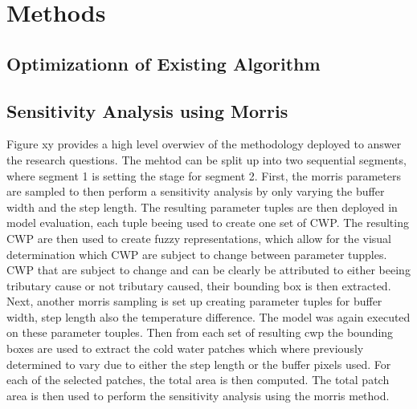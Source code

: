\section{Methods}


\subsection{Optimizationn of Existing Algorithm}

% 



\subsection{Sensitivity Analysis using Morris}

Figure xy provides a high level overwiev of the methodology deployed to answer the research questions. The mehtod can be split up into two sequential segments, where segment 1 is setting the stage for segment 2. First, the morris parameters are sampled to then perform a sensitivity analysis by only varying the buffer width and the step length. The resulting parameter tuples are then deployed in model evaluation, each tuple beeing used to create one set of CWP. The resulting CWP are then used to create fuzzy representations, which allow for the visual determination which CWP are subject to change between parameter tupples. CWP that are subject to change and can be clearly be attributed to either beeing tributary cause or not tributary caused, their bounding box is then extracted. Next, another morris sampling is set up creating parameter tuples for buffer width, step length also the temperature difference. The model was again executed on these parameter touples. Then from each set of resulting cwp the bounding boxes are used to extract the cold water patches which where previously determined to vary due to either the step length or the buffer pixels used. For each of the selected patches, the total area is then computed. The total patch area is then used to perform the sensitivity analysis using the morris method.



